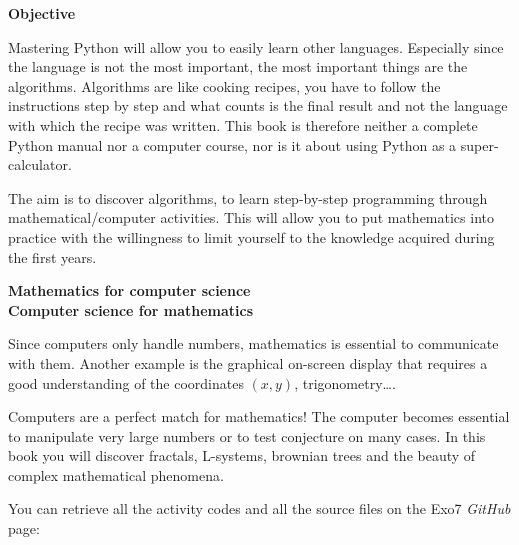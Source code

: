 \bigskip

{\large\textbf{Objective}}

Mastering Python will allow you to easily learn other languages. Especially since the language is not the most important, the most important things are the algorithms. Algorithms are like cooking recipes, you have to follow the instructions step by step and what counts is the final result and not the language with which the recipe was written. This book is therefore neither a complete Python manual nor a computer course, nor is it about using Python as a super-calculator.

The aim is to discover algorithms, to learn step-by-step programming through mathematical/computer activities. This will allow you to put mathematics into practice with the willingness to limit yourself to the knowledge acquired during the first years.

\bigskip

{\large\textbf{Mathematics for computer science}}\\
{\large\textbf{Computer science for mathematics}}

Since computers only handle numbers, mathematics is essential to communicate with them. Another example is the graphical on-screen display that requires a good understanding of the coordinates $(x,y)$, trigonometry\ldots{}.

Computers are a perfect match for mathematics! The computer becomes essential to manipulate very large numbers or to test conjecture on many cases. In this book you will discover fractals, L-systems, brownian trees and the beauty of complex mathematical phenomena.

\bigskip

\begin{center}
You can retrieve all the activity \Python{} codes and all the source files on the Exo7 \emph{GitHub} page:

\medskip

\end{center}


\vspace*{\fill}



